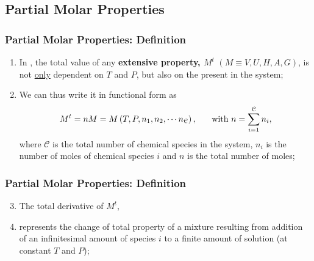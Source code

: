 \documentclass[10pt,compress,handout,ignorenonframetext,unknownkeysallowed]{beamer}
\begin{document}
\subsection{Partial Molar Properties}

\begin{frame}
  \frametitle{Partial Molar Properties: Definition}
  \begin{enumerate}%
    \item<1-> In , the total value of any {\bf extensive property, $M^{t}$} $\left(M\equiv V,U, H, A, G\right)$, is not \underline{only} dependent on $T$ and $P$, but also on the  present in the system;
    \item<2-> We can thus write it in functional form as
      \begin{displaymath}
        M^{t}=nM = M\left(T,P,n_{1}, n_{2}, \cdots n_{\mathcal{C}}\right), \hspace{.5cm} \text{ with } n = \summation[n_{i}]{i=1}{\mathcal{C}},
      \end{displaymath}
      where $\mathcal{C}$ is the total number of chemical species in the system, $n_{i}$ is the number of moles of chemical species $i$ and $n$ is the total number of moles;
  \end{enumerate} 
\end{frame}
\normalsize
\begin{frame}
  \frametitle{Partial Molar Properties: Definition}
  \begin{enumerate}\setcounter{enumi}{2}
    \item<1-> The total derivative of $M^{t}$,
    \item<3->  represents the change of total property  of a mixture resulting from addition of an infinitesimal amount of species $i$ to a finite amount of solution (at constant $T$ and $P$);
  \end{enumerate}
\end{frame}
\normalsize
\end{document}
